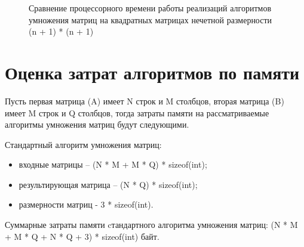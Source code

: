 \begin{figure}[h!]
	
	
	\caption{Сравнение процессорного времени работы реализаций алгоритмов умножения матриц на квадратных матрицах нечетной размерности (n + 1) * (n + 1)}
	
	\label{fig:fig2}
	
\end{figure}

\clearpage

\section{Оценка затрат алгоритмов по памяти}

Пусть первая матрица (A) имеет N строк и M столбцов, вторая матрица (B) имеет M строк и Q столбцов, тогда затраты памяти на рассматриваемые алгоритмы умножения матриц будут следующими.

Стандартный алгоритм умножения матриц:\\
\begin{itemize}
\item входные матрицы -- (N * M + M * Q) * sizeof(int); 
\item результирующая матрица -- (N * Q) * sizeof(int); 
\item размерности матриц -  3 * sizeof(int).
\end{itemize}

Суммарные затраты памяти cтандартного алгоритма умножения матриц:
(N * M + M * Q + N * Q + 3) * sizeof(int) байт.

